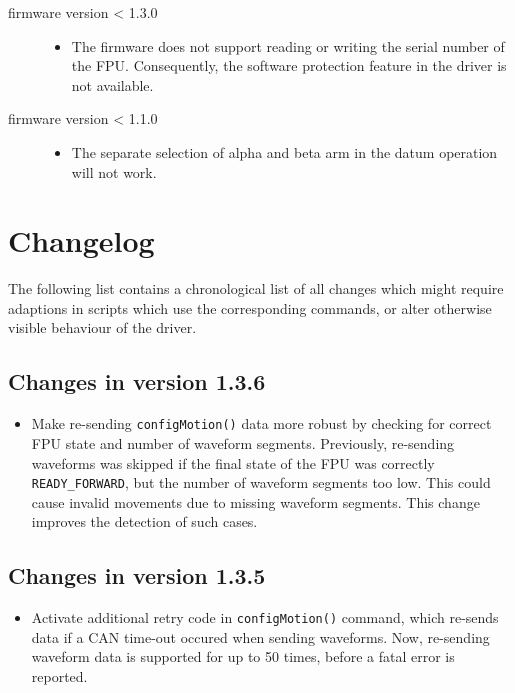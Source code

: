 \documentclass[11pt,a4paper]{report}
\begin{document}
\begin{description}
\item[firmware version < 1.3.0]
  
  \begin{itemize}
  \item The firmware does not support reading or writing the serial number of the FPU.
    Consequently, the software protection feature in the driver is not available.
  \end{itemize}

\item[firmware version < 1.1.0]
  
  \begin{itemize}
  \item The separate selection of alpha and beta arm in the datum operation will not work.
  \end{itemize}
  
\end{description}


\section{Changelog}
\label{sec:changelog}

The following list contains a chronological list of all changes which
might require adaptions in scripts which use the corresponding
commands, or alter otherwise visible behaviour of the driver.


\subsection*{Changes in version 1.3.6}
\begin{itemize}
\item Make re-sending \texttt{configMotion()} data more robust by
  checking for correct FPU state and number of waveform segments.
  Previously, re-sending waveforms was skipped if the final state of
  the FPU was correctly \texttt{READY\_FORWARD}, but the number of
  waveform segments too low. This could cause invalid movements due to
  missing waveform segments. This change improves the detection of
  such cases.
\end{itemize}

\subsection*{Changes in version 1.3.5}
\begin{itemize}
\item Activate additional retry code in \texttt{configMotion()}
  command, which re-sends data if a CAN time-out occured when sending
  waveforms.  Now, re-sending waveform data is supported for up to 50
  times, before a fatal error is reported.
\end{itemize}
\end{document}
